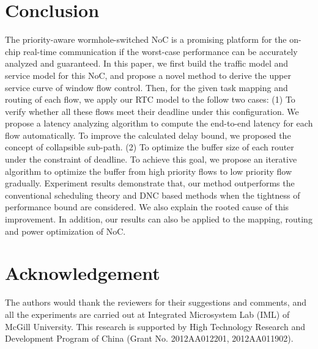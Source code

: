 \documentclass[10pt,journal]{IEEEtran}
\begin{document}
\section{Conclusion}\label{conclusion}
The priority-aware wormhole-switched NoC is a promising platform for the on-chip real-time communication if the worst-case performance can be accurately analyzed and guaranteed. In this paper, we first build the traffic model and service model for this NoC, and propose a novel method to derive the upper service curve of window flow control. Then, for the given task mapping and routing of each flow, we apply our RTC model to the follow two cases: (1) To verify whether all these flows meet their deadline under this configuration. We propose a latency analyzing algorithm to compute the end-to-end latency for each flow automatically. To improve the calculated delay bound, we proposed the concept of collapsible sub-path. (2) To optimize the buffer size of each router under the constraint of deadline. To achieve this goal, we propose an iterative algorithm to optimize the buffer from high priority flows to low priority flow gradually. Experiment results demonstrate that, our method outperforms the conventional scheduling theory and DNC based methods when the tightness of performance bound are considered. We also explain the rooted cause of this improvement. In addition, our results can also be applied to the mapping, routing and power optimization of NoC.

\section*{Acknowledgement}
The authors would thank the reviewers for their suggestions and comments, and all the experiments are carried out at Integrated Microsystem Lab (IML) of McGill University. This research is supported by High Technology Research and Development Program of China (Grant No. 2012AA012201, 2012AA011902).



\end{document}
